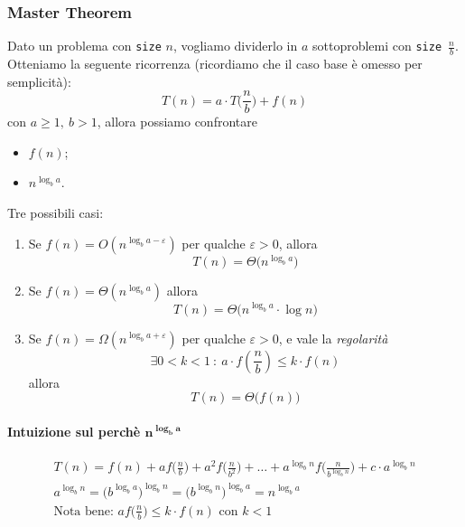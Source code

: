 \subsubsection{Master Theorem} \label{mastertheorem}
Dato un problema con \texttt{size} $n$, vogliamo dividerlo in $a$ sottoproblemi 
con \mbox {\texttt{size} $\frac{n}{b}$}. Otteniamo la seguente ricorrenza (ricordiamo che
il caso base è omesso per semplicità):
\[
    T(n) = a \cdot T\Big(\frac{n}{b}\Big) + f(n)
\]
con $a \geq 1, \ b > 1$, allora possiamo confrontare
\begin{itemize}
    \item $f(n)$;
    \item $n^{\log_b a}$.
\end{itemize}
Tre possibili casi:
\begin{enumerate}
    \item Se $f(n) = O(n^{\log_b a - \varepsilon})$ per qualche $\varepsilon > 0$,
    allora $$T(n) = \Theta \big( n^{\log_b a} \big)$$
    
    \item Se $f(n) = \Theta (n^{\log_b a})$ allora 
    $$T(n) = \Theta \big( n^{\log_b a} \cdot \log n \big)$$
    
    \item Se $f(n) = \Omega (n^{\log_b a + \varepsilon})$ per qualche $\varepsilon > 0$,
    e vale la \emph{regolarità}
    $$ \exists 0 < k < 1 \ : \ a \cdot f(\frac{n}{b}) \leq k \cdot f(n)$$
    allora
    $$ T(n) = \Theta \big( f(n) \big) $$ 
\end{enumerate}

\paragraph{Intuizione sul perchè $\boldsymbol{n^{\log_b a}}$} 
\begin{gather*}
    T(n) = f(n) + af\Big(\frac{n}{b}\Big) + a^2f\Big(\frac{n}{b^2}\Big) + \dots + a^{\log_b n}f\Big(\frac{n}{b^{\log_b n}}\Big) + c \cdot a^{\log_b n} \\
    a^{\log_b n} = \big(b^{\log_b a}\big)^{\log_b n} = \big(b^{\log_b n}\big)^{\log_b a} = n^{\log_b a} \\
    \text{Nota bene: } af\Big(\frac{n}{b}\Big) \leq k \cdot f(n) \text{ con } k < 1
\end{gather*}

